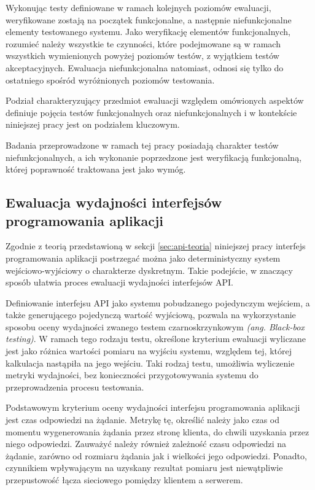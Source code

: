 Wykonując testy definiowane w ramach kolejnych poziomów ewaluacji, weryfikowane zostają na początek funkcjonalne, a następnie niefunkcjonalne elementy testowanego systemu. Jako weryfikację elementów funkcjonalnych, rozumieć należy wszystkie te czynności, które podejmowane są w ramach wszystkich wymienionych powyżej poziomów testów, z wyjątkiem testów akceptacyjnych. Ewaluacja niefunkcjonalna natomiast, odnosi się tylko do ostatniego spośród wyróżnionych poziomów testowania.

Podział charakteryzujący przedmiot ewaluacji względem omówionych aspektów definiuje pojęcia testów funkcjonalnych oraz niefunkcjonalnych i w kontekście niniejszej pracy jest on podziałem kluczowym.

Badania przeprowadzone w ramach tej pracy posiadają charakter testów niefunkcjonalnych, a ich wykonanie poprzedzone jest weryfikacją funkcjonalną, której poprawność traktowana jest jako wymóg.
\subsection*{Ewaluacja wydajności interfejsów programowania aplikacji}
Zgodnie z teorią przedstawioną w sekcji \ref{sec:api-teoria} niniejszej pracy interfejs programowania aplikacji postrzegać można jako deterministyczny system wejściowo-wyjściowy o charakterze dyskretnym. Takie podejście, w znaczący sposób ułatwia proces ewaluacji wydajności interfejsów API.

Definiowanie interfejsu API jako systemu pobudzanego pojedynczym wejściem, a także generującego pojedynczą wartość wyjściową, pozwala na wykorzystanie sposobu oceny wydajności zwanego testem czarnoskrzynkowym \textit{(ang. Black-box testing)}. W ramach tego rodzaju testu, określone kryterium ewaluacji wyliczane jest jako różnica wartości pomiaru na wyjściu systemu, względem tej, której kalkulacja nastąpiła na jego wejściu. Taki rodzaj testu, umożliwia wyliczenie metryki wydajności, bez konieczności przygotowywania systemu do przeprowadzenia procesu testowania.

Podstawowym kryterium oceny wydajności interfejsu programowania aplikacji jest czas odpowiedzi na żądanie. Metrykę tę, określić należy jako czas od momentu wygenerowania żądania przez stronę klienta, do chwili uzyskania przez niego odpowiedzi. Zauważyć należy również zależność czasu odpowiedzi na żądanie, zarówno od rozmiaru żądania jak i wielkości jego odpowiedzi. Ponadto, czynnikiem wpływającym na uzyskany rezultat pomiaru jest niewątpliwie przepustowość łącza sieciowego pomiędzy klientem a serwerem.

